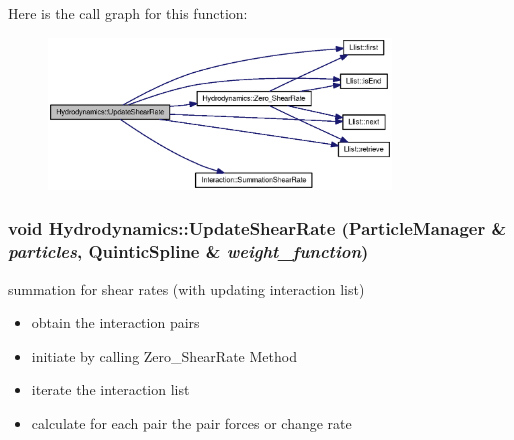 Here is the call graph for this function:\nopagebreak
\begin{figure}[H]
\begin{center}
\leavevmode
\includegraphics[width=258pt]{classHydrodynamics_49570aaeedea32d7a2baf0532880b2e8_cgraph}
\end{center}
\end{figure}
\hypertarget{classHydrodynamics_7ae4f1005699f13414ec6c487bac0ee0}{
\subsubsection[{UpdateShearRate}]{\setlength{\rightskip}{0pt plus 5cm}void Hydrodynamics::UpdateShearRate ({\bf ParticleManager} \& {\em particles}, \/  {\bf QuinticSpline} \& {\em weight\_\-function})}}
\label{classHydrodynamics_7ae4f1005699f13414ec6c487bac0ee0}


summation for shear rates (with updating interaction list) 



\begin{itemize}
\item obtain the interaction pairs\end{itemize}


\begin{itemize}
\item initiate by calling Zero\_\-ShearRate Method\end{itemize}


\begin{itemize}
\item iterate the interaction list\end{itemize}


\begin{itemize}
\item calculate for each pair the pair forces or change rate \end{itemize}


